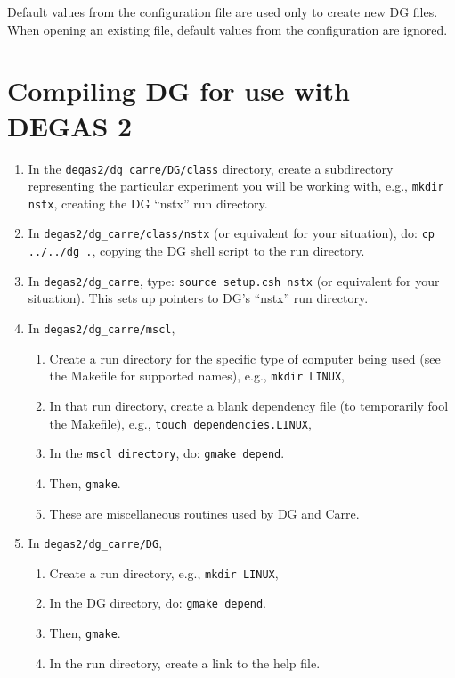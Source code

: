 \documentclass[12pt]{report}
\begin{document}
Default values from the configuration file are used only to create new
DG files. When opening an existing file, default values from the
configuration are ignored.

\section{Compiling DG for use with DEGAS 2}
\label{dgcompile}

\begin{enumerate}
  \item In the
\verb+degas2/dg_carre/DG/class+ directory, create a subdirectory
representing the particular experiment you will be working with,
e.g., \verb+mkdir nstx+, creating the DG ``nstx'' run directory.
  \item In \verb+degas2/dg_carre/class/nstx+ (or equivalent
for your situation), do: \verb+cp ../../dg .+, copying the DG
shell script to the run directory.
  \item In \verb+degas2/dg_carre+, type: 
\verb+source setup.csh nstx+ (or equivalent for your
situation).  This sets up pointers
to DG's ``nstx'' run directory.
   \item In \verb+degas2/dg_carre/mscl+, 
   \begin{enumerate}
        \item Create a run directory for the
specific type of computer being used (see the Makefile
for supported names), e.g., \verb+mkdir LINUX+,
        \item In that run directory, create a blank dependency file (to 
          temporarily fool the Makefile), e.g., 
\verb+touch dependencies.LINUX+,
        \item In the \verb+mscl directory+, do: 
\verb+gmake depend+.
        \item Then, \verb+gmake+.
        \item These are miscellaneous routines used by DG and Carre.
   \end{enumerate}
   \item In \verb+degas2/dg_carre/DG+,
   \begin{enumerate}
        \item Create a run directory, e.g., \verb+mkdir LINUX+,
        \item In the DG directory, do: \verb+gmake depend+.
        \item Then, \verb+gmake+.
        \item In the run directory, create a link to the help file. \\  

\end{enumerate}
\end{enumerate}
\end{document}
